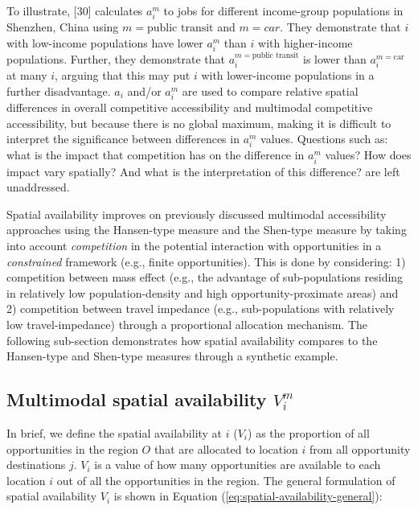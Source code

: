 \documentclass[10pt,letterpaper]{article}
\begin{document}
To illustrate, {[}30{]} calculates \(a_i^m\) to jobs for different
income-group populations in Shenzhen, China using
\(m = \text{public transit}\) and \(m={car}\). They demonstrate that
\(i\) with low-income populations have lower \(a_i^m\) than \(i\) with
higher-income populations. Further, they demonstrate that
\(a_i^{m=\text{public transit}}\) is lower than \(a_i^{m=\text{car}}\)
at many \(i\), arguing that this may put \(i\) with lower-income
populations in a further disadvantage. \(a_i\) and/or \(a_i^m\) are used
to compare relative spatial differences in overall competitive
accessibility and multimodal competitive accessibility, but because
there is no global maximum, making it is difficult to interpret the
significance between differences in \(a_i^{m}\) values. Questions such
as: what is the impact that competition has on the difference in
\(a_i^m\) values? How does impact vary spatially? And what is the
interpretation of this difference? are left unaddressed.

Spatial availability improves on previously discussed multimodal
accessibility approaches using the Hansen-type measure and the Shen-type
measure by taking into account \emph{competition} in the potential
interaction with opportunities in a \emph{constrained} framework (e.g.,
finite opportunities). This is done by considering: 1) competition
between mass effect (e.g., the advantage of sub-populations residing in
relatively low population-density and high opportunity-proximate areas)
and 2) competition between travel impedance (e.g., sub-populations with
relatively low travel-impedance) through a proportional allocation
mechanism. The following sub-section demonstrates how spatial
availability compares to the Hansen-type and Shen-type measures through
a synthetic example.

\hypertarget{multimodal-spatial-availability-v_im}{%
\subsection{\texorpdfstring{Multimodal spatial availability
\(V_i^m\)}{Multimodal spatial availability V\_i\^{}m}}\label{multimodal-spatial-availability-v_im}}

In brief, we define the spatial availability at \(i\) (\(V_{i}\)) as the
proportion of all opportunities in the region \(O\) that are allocated
to location \(i\) from all opportunity destinations \(j\). \(V_{i}\) is
a value of how many opportunities are available to each location \(i\)
out of all the opportunities in the region. The general formulation of
spatial availability \(V_{i}\) is shown in Equation
(\ref{eq:spatial-availability-general}):
\end{document}
